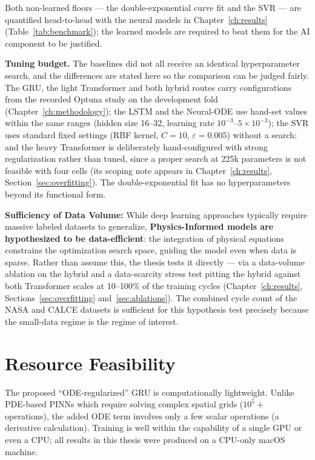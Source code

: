 \noindent
Both non-learned floors --- the double-exponential curve fit and the SVR --- are
quantified head-to-head with the neural models in Chapter~\ref{ch:results}
(Table~\ref{tab:benchmark}); the learned models are required to beat them for the
AI component to be justified.

\medskip
\noindent \textbf{Tuning budget.} The baselines did not all receive an identical
hyperparameter search, and the differences are stated here so the comparison can
be judged fairly. The GRU, the light Transformer and both hybrid routes carry
configurations from the recorded Optuna study on the development fold
(Chapter~\ref{ch:methodology}); the LSTM and the Neural-ODE use hand-set values
within the same ranges (hidden size 16--32, learning rate
$10^{-3}$--$5\times10^{-3}$); the SVR uses standard fixed settings (RBF kernel,
$C=10$, $\varepsilon=0.005$) without a search; and the heavy Transformer is
deliberately hand-configured with strong regularization rather than tuned, since
a proper search at 225k parameters is not feasible with four cells (its scoping
note appears in Chapter~\ref{ch:results}, Section~\ref{sec:overfitting}). The
double-exponential fit has no hyperparameters beyond its functional form.

\medskip
\noindent \textbf{Sufficiency of Data Volume:} While deep learning approaches typically require massive labeled datasets to generalize, \textbf{Physics-Informed models are hypothesized to be data-efficient}: the integration of physical equations constrains the optimization search space, guiding the model even when data is sparse. Rather than assume this, the thesis tests it directly --- via a data-volume ablation on the hybrid and a data-scarcity stress test pitting the hybrid against both Transformer scales at 10--100\% of the training cycles (Chapter~\ref{ch:results}, Sections~\ref{sec:overfitting} and~\ref{sec:ablations}). The combined cycle count of the NASA and CALCE datasets is sufficient for this hypothesis test precisely because the small-data regime is the regime of interest.

\section{Resource Feasibility}
\label{sec:resource_feasibility}

The proposed ``ODE-regularized'' GRU is computationally lightweight. Unlike
PDE-based PINNs which require solving complex spatial grids ($10^5+$ operations),
the added ODE term involves only a few scalar operations (a derivative
calculation). Training is well within the capability of a single GPU or even a
CPU; all results in this thesis were produced on a CPU-only macOS machine.

